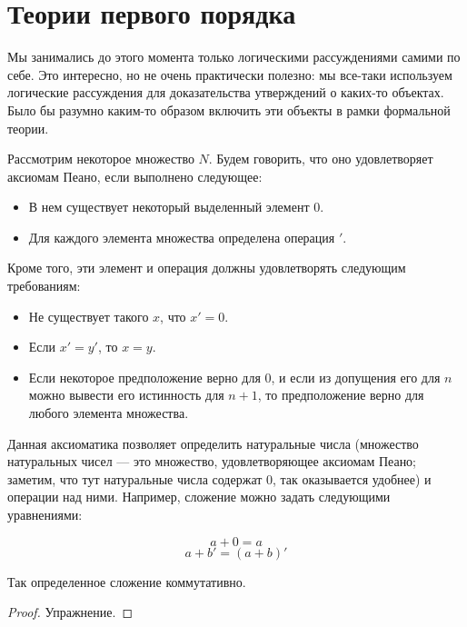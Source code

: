 \section{Теории первого порядка}

Мы занимались до этого момента только логическими рассуждениями самими по 
себе. Это интересно, но не очень практически полезно: мы все-таки
используем логические рассуждения для доказательства утверждений о каких-то
объектах. Было бы разумно каким-то образом включить эти объекты в рамки
формальной теории.


Рассмотрим некоторое множество $N$. Будем говорить, что оно удовлетворяет
аксиомам Пеано, если выполнено следующее:

\begin{itemize}
\item В нем существует некоторый выделенный элемент 0.
\item Для каждого элемента множества определена операция $'$.
\end{itemize}

Кроме того, эти элемент и операция должны удовлетворять следующим требованиям:
\begin{itemize}
\item Не существует такого $x$, что $x'=0$.
\item Если $x'=y'$, то $x=y$.
\item Если некоторое предположение верно для $0$, и если из допущения его
для $n$ можно вывести его истинность для $n+1$, то предположение верно
для любого элемента множества.
\end{itemize}

Данная аксиоматика позволяет определить натуральные числа (множество натуральных
чисел --- это множество, удовлетворяющее аксиомам Пеано; заметим, что тут натуральные
числа содержат 0, так оказывается удобнее) и операции над
ними. Например, сложение можно задать следующими уравнениями:

$$a+0 = a$$
$$a+b' = (a+b)'$$

\begin{theorem}Так определенное сложение коммутативно.
\end{theorem}
\begin{proof}Упражнение.\end{proof}

